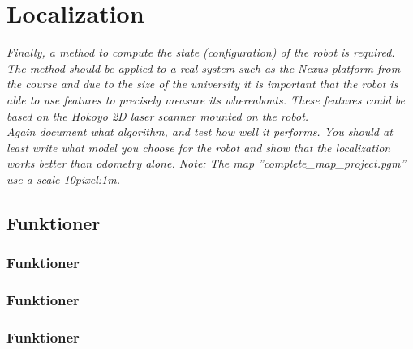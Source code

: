 \section{Localization}
\label{sec:loc}
\textit{Finally, a method to compute the state (configuration) of the robot is required. The method should be applied to a real system such as the Nexus platform from the course and due to the size of the university it is important that the robot is able to use features to precisely measure its whereabouts. These features could be based on the Hokoyo 2D laser scanner mounted on the robot.\\
Again document what algorithm, and test how well it performs. You should at least write what model you choose for the robot and show that the localization works better than odometry alone.
Note: The map ”complete\_map\_project.pgm” use a scale 10pixel:1m.}

\subsection{Funktioner}

\subsubsection{Funktioner}
\subsubsection{Funktioner}
\subsubsection{Funktioner}